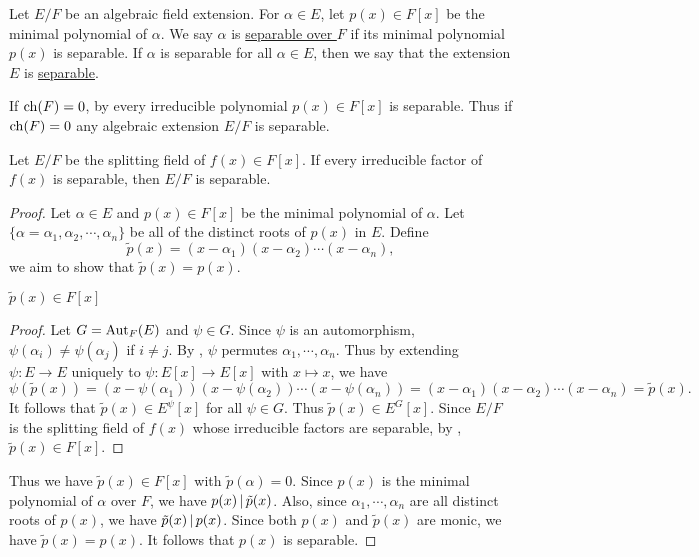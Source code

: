 \documentclass[11pt]{article}
\begin{document}
\begin{definition}
    Let $E/F$ be an algebraic field extension. For $\alpha\in E$, let $p(x)\in F[x]$ be the minimal polynomial of $\alpha$. We say $\alpha$ is \ul{separable over $F$} if its minimal polynomial $p(x)$ is separable. If $\alpha$ is separable for all $\alpha\in E$, then we say that the extension $E$ is \ul{separable}.
\end{definition}

\begin{example}
    If $\operatorname{ch}(F)=0$, by  every irreducible polynomial $p(x)\in F[x]$ is separable. Thus if $\operatorname{ch}(F)=0$ any algebraic extension $E/F$ is separable.
\end{example}

\begin{theorem}
    Let $E/F$ be the splitting field of $f(x)\in F[x]$. If every irreducible factor of $f(x)$ is separable, then $E/F$ is separable.
\end{theorem}

\begin{proof}
    Let $\alpha\in E$ and $p(x)\in F[x]$ be the minimal polynomial of $\alpha$. Let $\{\alpha=\alpha_1,\alpha_2,\cdots,\alpha_n\}$ be all of the distinct roots of $p(x)$ in $E$. Define
    \[\tilde{p}(x)=(x-\alpha_1)(x-\alpha_2)\cdots(x-\alpha_n),\]
    we aim to show that $\tilde{p}(x)=p(x)$.

    \begin{claim}
        $\tilde{p}(x)\in F[x]$
    \end{claim}
    \begin{proof}
        Let $G=\operatorname{Aut}_F(E)$ and $\psi\in G$. Since $\psi$ is an automorphism, $\psi(\alpha_i)\neq\psi(\alpha_j)$ if $i\neq j$. By , $\psi$ permutes $\alpha_1,\cdots,\alpha_n$. Thus by extending $\psi:E\to E$ uniquely to $\psi:E[x]\to E[x]$ with $x\mapsto x$, we have
        \[\psi(\tilde{p}(x))=(x-\psi(\alpha_1))(x-\psi(\alpha_2))\cdots(x-\psi(\alpha_n))=(x-\alpha_1)(x-\alpha_2)\cdots(x-\alpha_n)=\tilde{p}(x).\]
        It follows that $\tilde{p}(x)\in E^\psi[x]$ for all $\psi\in G$. Thus $\tilde{p}(x)\in E^G[x]$. Since $E/F$ is the splitting field of $f(x)$ whose irreducible factors are separable, by , $\tilde{p}(x)\in F[x]$.
        
    \end{proof}
    Thus we have $\tilde{p}(x)\in F[x]$ with $\tilde{p}(\alpha)=0$. Since $p(x)$ is the minimal polynomial of $\alpha$ over $F$, we have $p(x)\,|\, \tilde{p}(x)$. Also, since $\alpha_1,\cdots,\alpha_n$ are all distinct roots of $p(x)$, we have $\tilde{p}(x)\,|\, p(x)$. Since both $p(x)$ and $\tilde{p}(x)$ are monic, we have $\tilde{p}(x)=p(x)$. It follows that $p(x)$ is separable.
    
\end{proof}
\end{document}
